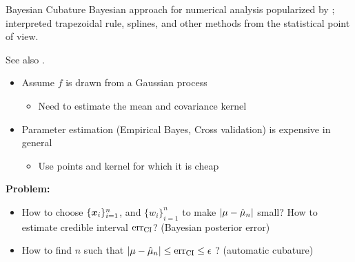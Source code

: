 \documentclass[handout, 10pt,compress,xcolor={usenames,dvipsnames}]{beamer} %
\newcommand{\CI}{\textup{CI}}
\newcommand{\err}{{\text{err}}}
\newcommand{\errtol}{{\epsilon}}
\def\abs#1{\ensuremath{\left \lvert #1 \right \rvert}}
\begin{document}
\begin{frame}{Bayesian Cubature}
	\vspace*{-4ex}
	Bayesian approach for numerical analysis popularized by ; 
	interpreted trapezoidal rule, splines, and other methods from the statistical point of view.
	
	See also \ocite{OHa91a}.
	
	
	
	\begin{itemize}
		\item Assume \alert{$f$} is drawn from a Gaussian process 
		\begin{itemize}
			\item Need to estimate the mean and covariance kernel
		\end{itemize}
		\item Parameter estimation (Empirical Bayes, Cross validation) is expensive in general
		\begin{itemize}
			\item Use points and kernel for which it is cheap
		\end{itemize}
	\end{itemize}

	{
	\textbf{Problem:}
	\vspace*{-4ex}
	\begin{itemize}
		\item How to choose \alert{$\{\boldsymbol{x}_i\}_{i=1}^n$}, and
		\alert{$\{w_i\}_{i=1}^n$} to make $\abs{\mu - \hmu_n}$ small? How to estimate credible interval $\err_\CI$? 
		\alert{(Bayesian posterior error)}
		\item How to find $n$ such that $\abs{\mu - \hmu_n} \le \err_\CI \le \errtol $ ? \alert{(automatic cubature)}
	\end{itemize}
}
\end{frame}
\end{document}

